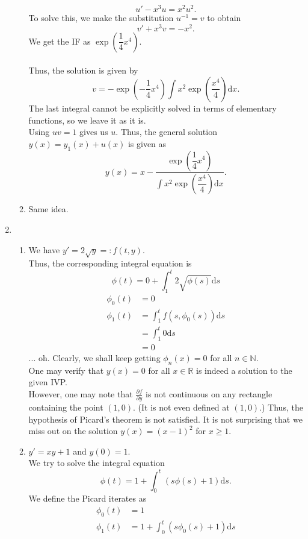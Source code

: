 \documentclass{article}
\begin{document}
\begin{enumerate}[label = Q.\arabic*.]
\begin{enumerate}[label = (\roman*)]
		\[u' - x^3u = x^2u^2.\]
		To solve this, we make the substitution $u^{-1} = v$ to obtain
		\[v' + x^3v = -x^2.\]
		We get the IF as $\exp\left(\dfrac{1}{4}x^4\right).$\\~\\
		Thus, the solution is given by
		\[v = -\exp\left(-\dfrac{1}{4}x^4\right)\int x^2\exp\left(\dfrac{x^4}{4}\right) \text{d}x.\]
		The last integral cannot be explicitly solved in terms of elementary functions, so we leave it as it is.\\
		Using $uv = 1$ gives us $u.$ Thus, the general solution $y(x) = y_1(x) + u(x)$ is given as
		\[y(x) = x - \dfrac{\exp\left(\dfrac{1}{4}x^4\right)}{\displaystyle\int x^2\exp\left(\dfrac{x^4}{4}\right) \text{d}x}.\]
		\item Same idea.
	\end{enumerate}
	\item 
	\begin{enumerate}[label = (\roman*)] 
		\item We have $y' = 2\sqrt{y} =: f(t, y).$\\
		Thus, the corresponding integral equation is
		\[\phi(t) = 0 + \int_{1}^{t} 2\sqrt{\phi(s)} \text{d}s\]
		\begin{align*} 
			\phi_0(t) &= 0\\
			\phi_1(t) &= \int_{1}^{t} f(s, \phi_0(s)) \text{d}s\\
			&= \int_{1}^{t} 0 \text{d}s\\
			&= 0
		\end{align*}
		... oh. Clearly, we shall keep getting $\phi_n(x) = 0$ for all $n \in \mathbb{N}.$\\
		One may verify that $y(x) = 0$ for all $x \in \mathbb{R}$ is indeed a solution to the given IVP.\\
		However, one may note that $\frac{\partial f}{\partial y}$ is not continuous on any rectangle containing the point $(1, 0).$ (It is not even defined at $(1, 0)$.) Thus, the hypothesis of Picard's theorem is not satisfied. It is not surprising that we miss out on the solution $y(x) = (x - 1)^2$ for $x \ge 1.$
		\item $y' = xy + 1$ and $y(0) = 1.$\\
		We try to solve the integral equation
		\[\phi(t) = 1 + \int_{0}^{t} (s\phi(s) + 1) \text{d}s.\]
		We define the Picard iterates as
		\begin{align*} 
			\phi_0(t) &= 1\\
			\phi_1(t) &= 1 + \int_{0}^{t} (s\phi_0(s) + 1) \text{d}s\\

\end{align*}
\end{enumerate}
\end{enumerate}
\end{document}
